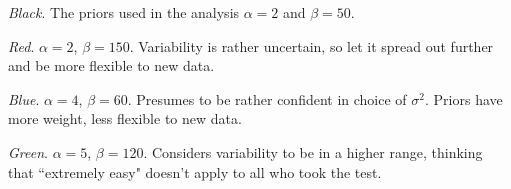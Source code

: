 \documentclass[12pt]{article}
\begin{document}
\noindent \emph{Black}.  The priors used in the analysis $\alpha=2$ and $\beta=50$.

\noindent \emph{Red}. $\alpha=2$, $\beta=150$.  Variability is rather uncertain, so let it spread out further and be more flexible to new data.

\noindent \emph{Blue}. $\alpha=4$, $\beta=60$.  Presumes to be rather confident in choice of $\sigma^2$.  Priors have more weight, less flexible to new data.

\noindent \emph{Green}. $\alpha=5$, $\beta=120$.  Considers variability to be in a higher range, thinking that ``extremely easy" doesn't apply to all who took the test.

%
\end{document}
